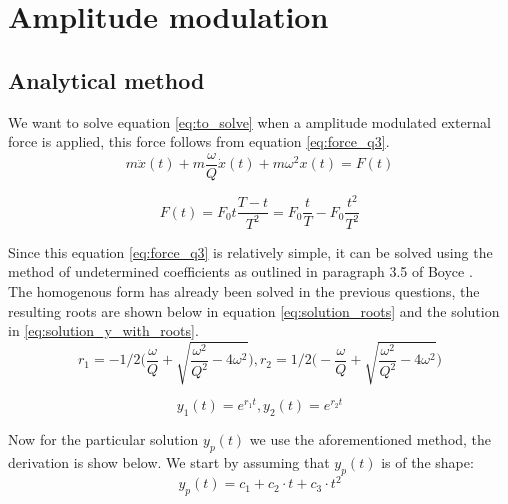 \section{Amplitude modulation}
\subsection{Analytical method}
We want to solve equation \ref{eq:to_solve} when a amplitude modulated external force is applied, this force follows from equation \ref{eq:force_q3}.\\

\begin{equation}
    m \ddot{x}(t)+m\frac{\omega}{Q}\dot{x}(t)+m \omega^2 x(t) = F(t)
    \label{eq:to_solve}
\end{equation}

\begin{equation}
    F(t) = F_0 t\frac{T-t}{T^2}= F_0 \frac{t}{T} - F_0 \frac{t^2}{T^2}
    \label{eq:force_q3}
\end{equation}

Since this equation \ref{eq:force_q3} is relatively simple, it can be solved using the method of undetermined coefficients as outlined in paragraph 3.5 of Boyce \cite{Boyce}.\\ The homogenous form has already been solved in the previous questions, the resulting roots are shown below in equation \ref{eq:solution_roots} and the solution in \ref{eq:solution_y_with_roots}.\\

\begin{equation}
    r_1 = -1/2 \biggl( \frac{\omega}{Q}+\sqrt{\frac{\omega^2}{Q^2}-4 \omega^2} \biggr), r_2 = 1/2 \biggl( -\frac{\omega}{Q}+\sqrt{\frac{\omega^2}{Q^2}-4 \omega^2} \biggr)
    \label{eq:solution_roots}
\end{equation}

\begin{equation}
    y_1(t) = e^{r_1 t},  y_2(t) = e^{r_2 t}
    \label{eq:solution_y_with_roots}
\end{equation}

Now for the particular solution $y_p(t)$ we use the aforementioned method, the derivation is show below. We start by assuming that $y_p(t)$ is of the shape:\\

\begin{equation*}
    y_p(t) = c_1 + c_2 \cdot t + c_3 \cdot t^2
\end{equation*}

